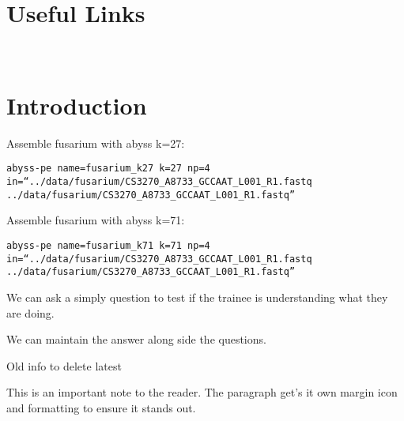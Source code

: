 \section{Useful Links}
 
\begin{description}[style=multiline,labelindent=0cm,align=left,leftmargin=0.5cm]
  \item[]\hfill\\
    \url{}
\end{description}

\newpage

\section{Introduction}


\begin{information}
\end{information}




\begin{steps}
Assemble fusarium with abyss k=27:
\begin{lstlisting}
abyss-pe name=fusarium_k27 k=27 np=4 in=“../data/fusarium/CS3270_A8733_GCCAAT_L001_R1.fastq ../data/fusarium/CS3270_A8733_GCCAAT_L001_R1.fastq”
\end{lstlisting}
\end{steps}

\begin{steps}
Assemble fusarium with abyss k=71:
\begin{lstlisting}
abyss-pe name=fusarium_k71 k=71 np=4 in=“../data/fusarium/CS3270_A8733_GCCAAT_L001_R1.fastq ../data/fusarium/CS3270_A8733_GCCAAT_L001_R1.fastq”
\end{lstlisting}
\end{steps}

\begin{questions}
We can ask a simply question to test if the trainee is understanding what they are doing. 
\begin{answer}
We can maintain the answer along side the questions.
\end{answer}
\end{questions}

Old info to delete latest



\begin{note}
This is an important note to the reader. The paragraph get's it own margin icon and formatting to
ensure it stands out.
\end{note}

